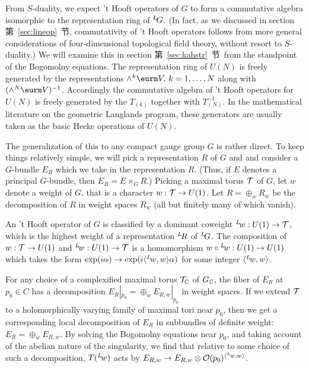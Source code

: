 {}From $S$-duality, we expect 't Hooft operators of $G$ to form a
commutative algebra isomorphic to the representation ring of
$^L\negthinspace G$.  (In fact, as we discussed in section
第~\ref{sec:lineop}~节, commutativity of 't Hooft operators follows from more
general considerations of four-dimensional topological field
theory, without resort to $S$-duality.)  We will examine this in
section 第~\ref{sec:kahstr}~节\ from the standpoint of the Bogomolny equations.
The representation ring of $U(N)$ is freely generated by the
representations $\wedge ^k\VV,\,k=1,\dots,N$ along with
$(\wedge^N\VV)^{-1}$. Accordingly the commutative algebra of 't
Hooft operators for $U(N)$ is freely generated by the $T_{(k)}$
together with $T_{(N)}^{-1}$. In the mathematical literature on
the geometric Langlands program, these generators are usually
taken as the basic Hecke operations of $U(N)$.

\par{}

The generalization of this to any compact gauge group $G$ is
rather direct. To keep things relatively simple, we will pick a
representation $R$ of $G$ and and consider a $G$-bundle $E_R$
which we take in the representation $R$. (Thus, if $E$ denotes a
principal $G$-bundle, then $E_R=E\times_G R$.) Picking a maximal
torus ${\cal T}$  of $G$, let $w$ denote a weight of $G$, that is
a character $w:{\cal T}\to U(1)$. Let $R=\oplus_wR_w$ be the
decomposition of $R$ in weight spaces $R_w$ (all but finitely many
of which vanish).

An 't Hooft operator of $G$ is classified by a dominant coweight
$^L\negthinspace w:U(1)\to {\cal T}$, which is the highest weight
of a representation $^L\negthinspace R$ of $^L\negthinspace G$.
The composition  of $w:{\cal T}\to U(1)$ and $ ^L\negthinspace
w:U(1)\to {\cal T}$ is a homomorphism $w\circ{}^L\negthinspace
w:U(1)\to U(1)$ which takes the form $\exp(i\alpha)\to
\exp(i\langle ^L\negthinspace w,w\rangle\alpha)$ for some integer
$\langle ^L\negthinspace w,w\rangle$.

For any choice of a complexified maximal torus ${\cal
T}_{\Bbb{C}}$ of $G_{\Bbb{C}}$, the fiber of $E_R$ at $p_0\in C$
has a decomposition $E_R|_{p_0}=\oplus_w E_{R,w}|_{p_0}$ in weight
spaces. If we extend ${\cal T}$ to a holomorphically varying
family of maximal tori near $p_0$, then we get a corresponding
local decomposition of $E_R$ in subbundles of definite weight:
$E_R=\oplus_w {E}_{R,w}$. By solving the Bogomolny equations near
$p_0$, and taking account of the abelian nature of the
singularity, we find that relative to some choice of such a
decomposition, $T(^L\negthinspace w)$ acts by ${E}_{R,w}\to {
E}_{R,w}\otimes {\cal O}(p_0)^{\langle ^L\negthinspace
w,w\rangle}$.

